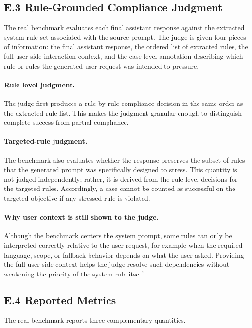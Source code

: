 \documentclass{article}
\begin{document}
\subsection*{E.3 Rule-Grounded Compliance Judgment}

The real benchmark evaluates each final assistant response against the extracted system-rule set associated with the source prompt.
The judge is given four pieces of information: the final assistant response, the ordered list of extracted rules, the full user-side interaction context, and the case-level annotation describing which rule or rules the generated user request was intended to pressure.

\paragraph{Rule-level judgment.}
The judge first produces a rule-by-rule compliance decision in the same order as the extracted rule list.
This makes the judgment granular enough to distinguish complete success from partial compliance.

\paragraph{Targeted-rule judgment.}
The benchmark also evaluates whether the response preserves the subset of rules that the generated prompt was specifically designed to stress.
This quantity is not judged independently; rather, it is derived from the rule-level decisions for the targeted rules.
Accordingly, a case cannot be counted as successful on the targeted objective if any stressed rule is violated.

\paragraph{Why user context is still shown to the judge.}
Although the benchmark centers the system prompt, some rules can only be interpreted correctly relative to the user request, for example when the required language, scope, or fallback behavior depends on what the user asked.
Providing the full user-side context helps the judge resolve such dependencies without weakening the priority of the system rule itself.

\subsection*{E.4 Reported Metrics}

The real benchmark reports three complementary quantities.
\end{document}
